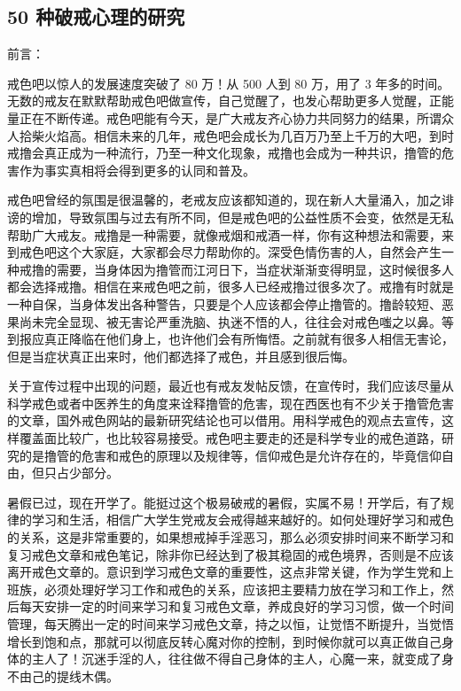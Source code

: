 \subsection{50 种破戒心理的研究}

前言：

戒色吧以惊人的发展速度突破了 80 万！从 500 人到 80 万，用了 3 年多的时间。无数的戒友在默默帮助戒色吧做宣传，自己觉醒了，也发心帮助更多人觉醒，正能量正在不断传递。戒色吧能有今天，是广大戒友齐心协力共同努力的结果，所谓众人拾柴火焰高。相信未来的几年，戒色吧会成长为几百万乃至上千万的大吧，到时戒撸会真正成为一种流行，乃至一种文化现象，戒撸也会成为一种共识，撸管的危害作为事实真相将会得到更多的认同和普及。

戒色吧曾经的氛围是很温馨的，老戒友应该都知道的，现在新人大量涌入，加之诽谤的增加，导致氛围与过去有所不同，但是戒色吧的公益性质不会变，依然是无私帮助广大戒友。戒撸是一种需要，就像戒烟和戒酒一样，你有这种想法和需要，来到戒色吧这个大家庭，大家都会尽力帮助你的。深受色情伤害的人，自然会产生一种戒撸的需要，当身体因为撸管而江河日下，当症状渐渐变得明显，这时候很多人都会选择戒撸。相信在来戒色吧之前，很多人已经戒撸过很多次了。戒撸有时就是一种自保，当身体发出各种警告，只要是个人应该都会停止撸管的。撸龄较短、恶果尚未完全显现、被无害论严重洗脑、执迷不悟的人，往往会对戒色嗤之以鼻。等到报应真正降临在他们身上，也许他们会有所悔悟。之前就有很多人相信无害论，但是当症状真正出来时，他们都选择了戒色，并且感到很后悔。

关于宣传过程中出现的问题，最近也有戒友发帖反馈，在宣传时，我们应该尽量从科学戒色或者中医养生的角度来诠释撸管的危害，现在西医也有不少关于撸管危害的文章，国外戒色网站的最新研究结论也可以借用。用科学戒色的观点去宣传，这样覆盖面比较广，也比较容易接受。戒色吧主要走的还是科学专业的戒色道路，研究的是撸管的危害和戒色的原理以及规律等，信仰戒色是允许存在的，毕竟信仰自由，但只占少部分。

暑假已过，现在开学了。能挺过这个极易破戒的暑假，实属不易！开学后，有了规律的学习和生活，相信广大学生党戒友会戒得越来越好的。如何处理好学习和戒色的关系，这是非常重要的，如果想戒掉手淫恶习，那么必须安排时间来不断学习和复习戒色文章和戒色笔记，除非你已经达到了极其稳固的戒色境界，否则是不应该离开戒色文章的。意识到学习戒色文章的重要性，这点非常关键，作为学生党和上班族，必须处理好学习工作和戒色的关系，应该把主要精力放在学习和工作上，然后每天安排一定的时间来学习和复习戒色文章，养成良好的学习习惯，做一个时间管理，每天腾出一定的时间来学习戒色文章，持之以恒，让觉悟不断提升，当觉悟增长到饱和点，那就可以彻底反转心魔对你的控制，到时候你就可以真正做自己身体的主人了！沉迷手淫的人，往往做不得自己身体的主人，心魔一来，就变成了身不由己的提线木偶。

